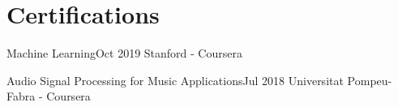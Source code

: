 \section{Certifications}
\resumeSubHeadingListStart

    \resumeSubheading
    {Machine Learning}{Oct 2019}
    {Stanford - Coursera}{}

    \resumeSubheading
    {Audio Signal Processing for Music Applications}{Jul 2018}
    {Universitat Pompeu-Fabra - Coursera}{}

\resumeSubHeadingListEnd